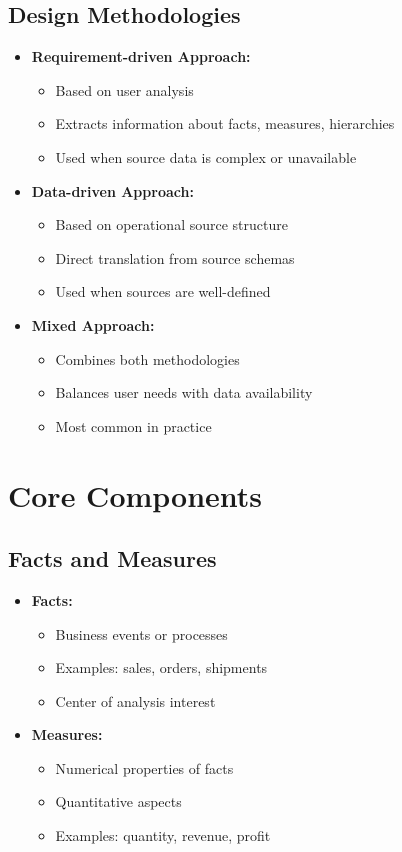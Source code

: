 \subsection{Design Methodologies}
\begin{itemize}
    \item \textbf{Requirement-driven Approach:}
        \begin{itemize}
            \item Based on user analysis
            \item Extracts information about facts, measures, hierarchies
            \item Used when source data is complex or unavailable
        \end{itemize}
    \item \textbf{Data-driven Approach:}
        \begin{itemize}
            \item Based on operational source structure
            \item Direct translation from source schemas
            \item Used when sources are well-defined
        \end{itemize}
    \item \textbf{Mixed Approach:}
        \begin{itemize}
            \item Combines both methodologies
            \item Balances user needs with data availability
            \item Most common in practice
        \end{itemize}
\end{itemize}

\section{Core Components}

\subsection{Facts and Measures}
\begin{itemize}
    \item \textbf{Facts:}
        \begin{itemize}
            \item Business events or processes
            \item Examples: sales, orders, shipments
            \item Center of analysis interest
        \end{itemize}
    \item \textbf{Measures:}
        \begin{itemize}
            \item Numerical properties of facts
            \item Quantitative aspects
            \item Examples: quantity, revenue, profit
        \end{itemize}
\end{itemize}

